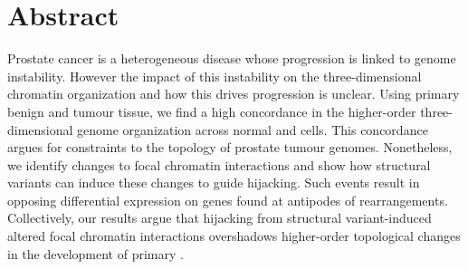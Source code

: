 \section{Abstract}

Prostate cancer is a heterogeneous disease whose progression is linked to genome instability.
However the impact of this instability on the three-dimensional chromatin organization and how this drives progression is unclear.
Using primary benign and tumour tissue, we find a high concordance in the higher-order three-dimensional genome organization across normal and  cells.
This concordance argues for constraints to the topology of prostate tumour genomes.
Nonetheless, we identify changes to focal chromatin interactions and show how structural variants can induce these changes to guide  hijacking.
Such events result in opposing differential expression on genes found at antipodes of rearrangements.
Collectively, our results argue that  hijacking from structural variant-induced altered focal chromatin interactions overshadows higher-order topological changes in the development of primary .
